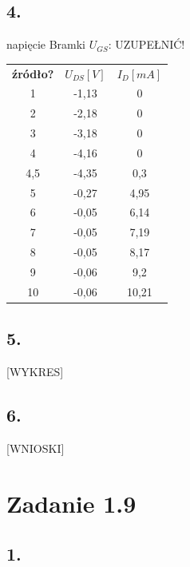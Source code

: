 \documentclass[polish,a4paper]{article}
\begin{document}
\subsection*{4.}
napięcie Bramki $U_{GS}$: UZUPEŁNIĆ!


\begin{center}
\begin{tabular}{|c|c|c|}
\hline
\textbf{źródło?} & \textbf{$U_{DS} [V]$} & \textbf{$I_D [mA]$}\\
\hhline{|=|=|=|}
1 & -1,13 & 0 \\
\hline
2 & -2,18 & 0 \\
\hline
3 & -3,18 & 0 \\
\hline
4 & -4,16 & 0 \\
\hline
4,5 & -4,35 & 0,3 \\
\hline
5 & -0,27 & 4,95 \\
\hline
6 & -0,05 & 6,14 \\
\hline
7 & -0,05 & 7,19 \\
\hline
8 & -0,05 & 8,17 \\
\hline
9 & -0,06 & 9,2 \\
\hline
10 & -0,06 & 10,21 \\
\hline


\end{tabular}
\end{center}


\subsection*{5.}
[WYKRES]




\subsection*{6.}
[WNIOSKI]

\newpage
\section{Zadanie 1.9}

\subsection*{1.}
\end{document}
